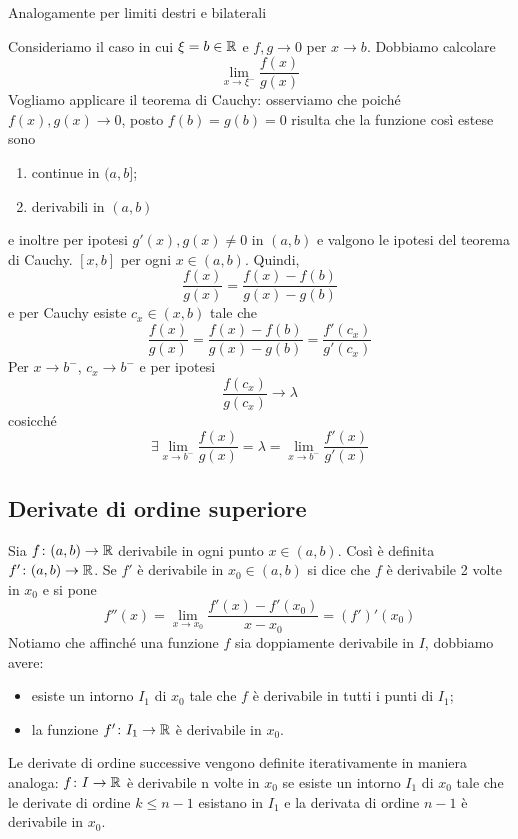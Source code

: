 \documentclass[a4paper]{article}
\begin{document}
Analogamente per limiti destri e bilaterali

\begin{snippetproof}{}
    Consideriamo il caso in cui \(\xi  =b\in\mathbb{R}\) e \(f,g \to 0\) per \(x\to b\).
    Dobbiamo calcolare
    \[
        \lim_{x\to\xi^-} \frac{f(x)}{g(x)}
    \]
    Vogliamo applicare il teorema di Cauchy: osserviamo che poiché \(f(x), g(x) \to 0\),
    posto \(f(b) = g(b)=0\) risulta che la funzione così estese sono
    \begin{enumerate}
        \item continue in \((a,b]\);
        \item derivabili in \((a,b)\)
    \end{enumerate}
    e inoltre per ipotesi \(g'(x), g(x) \neq 0\) in \((a,b)\) e valgono le ipotesi del teorema di Cauchy.
    \([x, b]\) per ogni \(x\in (a,b)\).
    Quindi, 
    \[
        \frac{f(x)}{g(x)} = \frac{f(x) - f(b)}{g(x) - g(b)}
    \]
    e per Cauchy esiste \(c_x \in (x,b)\) tale che
    \[
        \frac{f(x)}{g(x)} = \frac{f(x) - f(b)}{g(x) - g(b)} = \frac{f'(c_x)}{g'(c_x)}
    \]
    Per \(x\to b^-\), \(c_x \to b^-\) e per ipotesi
    \[
        \frac{f(c_x)}{g(c_x)} \to \lambda
    \]
    cosicché
    \[
        \exists \lim_{x\to b^-} \frac{f(x)}{g(x)} = \lambda = \lim_{x\to b^-} \frac{f'(x)}{g'(x)}
    \]
\end{snippetproof}

\pagebreak

\subsection{Derivate di ordine superiore}

Sia \(f\colon (a,b) \to \mathbb{R}\) derivabile in ogni punto \(x\in (a,b)\).
Così è definita \(f'\colon (a,b) \to \mathbb{R}\).
Se \(f'\) è derivabile in \(x_0 \in (a,b)\) si dice che \(f\)
è derivabile 2 volte in \(x_0\) e si pone
\[
    f''(x) = \lim_{x\to x_0} \frac{f'(x) - f'(x_0)}{x-x_0} = {(f')}'(x_0)
\]
Notiamo che affinché una funzione \(f\) sia doppiamente derivabile in \(I\), dobbiamo avere:
\begin{itemize}
    \item esiste un intorno \(I_1\) di \(x_0\)
    tale che \(f\) è derivabile in tutti i punti di \(I_1\);
    \item la funzione \(f'\colon I_1 \to \mathbb{R}\) è derivabile in \(x_0\).
\end{itemize}

Le derivate di ordine successive vengono definite iterativamente in maniera analoga:
\(f \colon I \to \mathbb{R}\) è derivabile n volte in \(x_0\)
se esiste un intorno \(I_1\) di \(x_0\) tale che le derivate di ordine
\(k \leq n-1\) esistano in \(I_1\) e la derivata di ordine \(n-1\) è derivabile in \(x_0\).
\end{document}
